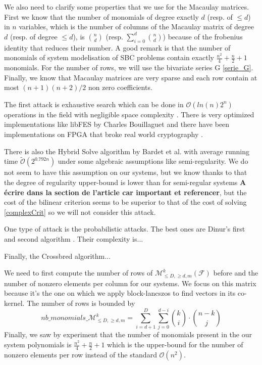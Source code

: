 \documentclass[english]{article}
\begin{document}
		We also need to clarify some properties that we use for the Macaulay matrices. First we know that the number of monomials of degree exactly $d$ (resp. of $\leq d$) in $n$ variables, which is the number of columns of the Macaulay matrix of degree $d$ (resp. of degree $\leq d$), is $\binom{n}{d}$ (resp. $\sum_{i=0}^{d}\binom{n}{d}$) because of the frobenius identity that reduces their number. A good remark is that the number of monomials of system modelisation of SBC problems contain exactly $\frac{n^2}{4} + \frac{n}{2} + 1$ monomials. For the number of rows, we will use the bivariate series G \ref{serie_G}. Finally, we know that Macaulay matrices are very sparse and each row contain at most $(n+1)(n+2)/2$ non zero coefficients.
		
		The first attack is exhaustive search which can be done in $\mathcal{O}(ln(n)2^n)$ operations in the field with negligible space complexity \cite{BCC+10}.
		There is very optimized implementations like libFES by Charles Bouillaguet and there have been implementations on FPGA that broke real world cryptography \cite{DDVY20}.
		
		There is also the Hybrid Solve algorithm by Bardet et al. \cite{BFSS13} with average running time $\tilde{\mathcal{O}}(2^{0.792n})$ under some algebraic assumptions like semi-regularity. We do not seem to have this assumption on our systems, but we know thanks to \cite{FSS11} that the degree of regularity upper-bound is lower than for semi-regular systems \textbf{A écrire dans la section de l'article car important et referencer}, but the cost of the bilinear criterion seems to be superior to that of the cost of solving \ref{complexCrit} so we will not consider this attack.
		
		One type of attack is the probabilistic attacks. The best ones are Dinur's first and second algorithm \cite{Itai21A, Itai21B}.
		Their complexity is...
		
		Finally, the Crossbred algorithm...
		
		We need to first compute the number of rows of $\mathcal{M}_{\leq D, \geq d, m}^k(\mathcal{F})$ before and the number of nonzero elements per column for our systems. We focus on this matrix because it's the one on which we apply block-lancszos to find vectors in its co-kernel.
		The number of rows is bounded by $$nb\_monomials\_\mathcal{M}_{\leq D, \geq d, m}^k = \sum_{i=d+1}^{D}\sum_{j=0}^{d-i} \binom{k}{i} \cdot \binom{n-k}{j}$$
		Finally, we saw by experiment that the number of monomials present in the our system polynomials is $\frac{n^2}{4} + \frac{n}{2} + 1$ which is the upper-bound for the number of nonzero elements per row instead of the standard $\mathcal{O}(n^2)$.
		
\end{document}
